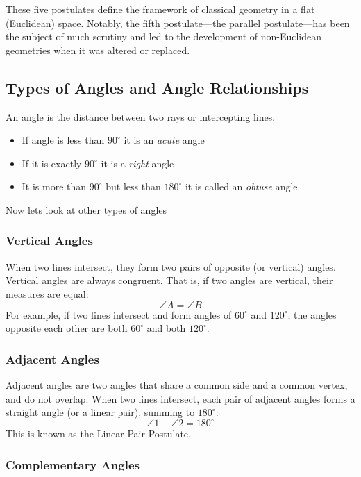 These five postulates define the framework of classical geometry in a flat (Euclidean) space. Notably, the fifth postulate—the parallel postulate—has been the subject of much scrutiny and led to the development of non-Euclidean geometries when it was altered or replaced.

\subsection{Types of Angles and Angle Relationships}

An angle is the distance between two rays or intercepting lines.

\begin{itemize}[label=\(-\)]
	\item If angle is less than \(90^\circ\) it is an \emph{acute} angle
	\item If it is exactly \(90^\circ\) it is a \emph{right} angle
	\item It is more than \(90^\circ\) but less than \(180^\circ\) it is called an \emph{obtuse} angle
\end{itemize}

Now lets look at other types of angles

\subsubsection{Vertical Angles}

When two lines intersect, they form two pairs of opposite (or vertical) angles. Vertical angles are always congruent. That is, if two angles are vertical, their measures are equal:
\[
\angle A = \angle B
\]
For example, if two lines intersect and form angles of \( 60^\circ \) and \( 120^\circ \), the angles opposite each other are both \( 60^\circ \) and both \( 120^\circ \).

\subsubsection{Adjacent Angles}

Adjacent angles are two angles that share a common side and a common vertex, and do not overlap. When two lines intersect, each pair of adjacent angles forms a straight angle (or a linear pair), summing to \(180^\circ\):
\[
\angle 1 + \angle 2 = 180^\circ
\]
This is known as the Linear Pair Postulate.

\subsubsection{Complementary Angles}

